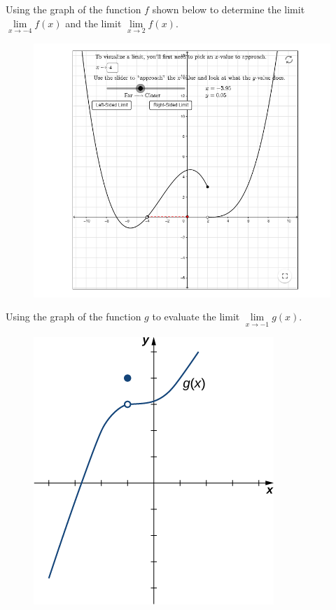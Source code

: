 \begin{example}
  Using the graph of the function \(f\) shown below to
  determine the limit \(\lim\limits_{x\to -4}f(x)\) and the limit
  \(\lim\limits_{x\to 2} f(x)\).
  
  \begin{figure}[h]
    \centering
  \href{https://www.geogebra.org/m/Ktr9uqYu}{\includegraphics[height=0.3\textheight]{img/clip_image001.png}}
  \end{figure}
\end{example}
\vspace*{2\baselineskip}

\begin{example}
  Using the graph of the function \(g\) to evaluate the
  limit \(\lim\limits_{x\to -1}g(x)\).
  
  \begin{figure}[h]
  \centering
  \includegraphics[scale=0.8]{img/imageedit_9_2225331012.png}
  \end{figure}
\end{example}
\vspace*{2\baselineskip}

